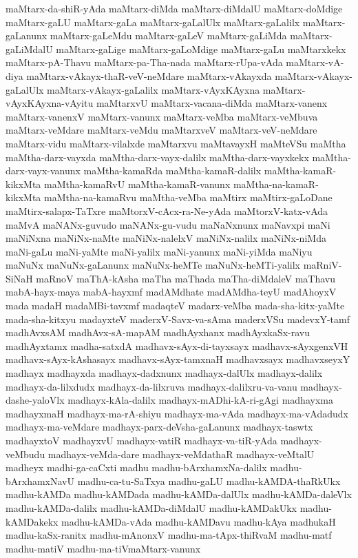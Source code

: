 {maMtarx-da-shiR-yAda
maMtarx-diMda
maMtarx-diMdalU
maMtarx-doMdige
maMtarx-gaLU
maMtarx-gaLa
maMtarx-gaLalUlx
maMtarx-gaLalilx
maMtarx-gaLanunx
maMtarx-gaLeMdu
maMtarx-gaLeV
maMtarx-gaLiMda
maMtarx-gaLiMdalU
maMtarx-gaLige
maMtarx-gaLoMdige
maMtarx-gaLu
maMtarxkekx
maMtarx-pA-Thavu
maMtarx-pa-Tha-nada
maMtarx-rUpa-vAda
maMtarx-vA-diya
maMtarx-vAkayx-thaR-veV-neMdare
maMtarx-vAkayxda
maMtarx-vAkayx-gaLalUlx
maMtarx-vAkayx-gaLalilx
maMtarx-vAyxKAyxna
maMtarx-vAyxKAyxna-vAyitu
maMtarxvU
maMtarx-vacana-diMda
maMtarx-vanenx
maMtarx-vanenxV
maMtarx-vanunx
maMtarx-veMba
maMtarx-veMbuva
maMtarx-veMdare
maMtarx-veMdu
maMtarxveV
maMtarx-veV-neMdare
maMtarx-vidu
maMtarx-vilalxde
maMtarxvu
maMtavayxH
maMteVSu
maMtha
maMtha-darx-vayxda
maMtha-darx-vayx-dalilx
maMtha-darx-vayxkekx
maMtha-darx-vayx-vanunx
maMtha-kamaRda
maMtha-kamaR-dalilx
maMtha-kamaR-kikxMta
maMtha-kamaRvU
maMtha-kamaR-vanunx
maMtha-na-kamaR-kikxMta
maMtha-na-kamaRvu
maMtha-veMba
maMtirx
maMtirx-gaLoDane
maMtirx-salapx-TaTxre
maMtorxV-cAcx-ra-Ne-yAda
maMtorxV-katx-vAda
maMvA
maNANx-guvudo
maNANx-gu-vudu
maNaNxnunx
maNavxpi
maNi
maNiNxna
maNiNx-naMte
maNiNx-nalelxV
maNiNx-nalilx
maNiNx-niMda
maNi-gaLu
maNi-yaMte
maNi-yalilx
maNi-yanunx
maNi-yiMda
maNiyu
maNuNx
maNuNx-gaLanunx
maNuNx-heMTe
maNuNx-heMTi-yalilx
maRniV-SiNaH
maRnoV
maThA-kAsha
maTha
maThada
maTha-diMdaleV
maThavu
mabA-hayx-maya
mabA-hayxmf
madAMdhate
madAMdha-teyU
madAhoyxV
mada
madaH
madaMBi-tavxmf
madaqteV
madarx-veMba
mada-sha-kitx-yaMte
mada-sha-kitxyu
madayxteV
maderxV-Savx-va-sAma
maderxVSu
madevxY-tamf
madhAvxsAM
madhAvx-sA-mapAM
madhAyxhanx
madhAyxkaSx-ravu
madhAyxtamx
madha-satxdA
madhavx-sAyx-di-tayxsayx
madhavx-sAyxgenxVH
madhavx-sAyx-kAshasayx
madhavx-sAyx-tamxnaH
madhavxsayx
madhavxseyxY
madhayx
madhayxda
madhayx-dadxnunx
madhayx-dalUlx
madhayx-dalilx
madhayx-da-lilxdudx
madhayx-da-lilxruva
madhayx-dalilxru-va-vanu
madhayx-dashe-yaloVlx
madhayx-kAla-dalilx
madhayx-mADhi-kA-ri-gAgi
madhayxma
madhayxmaH
madhayx-ma-rA-shiyu
madhayx-ma-vAda
madhayx-ma-vAdadudx
madhayx-ma-veMdare
madhayx-parx-deVsha-gaLanunx
madhayx-taswtx
madhayxtoV
madhayxvU
madhayx-vatiR
madhayx-va-tiR-yAda
madhayx-veMbudu
madhayx-veMda-dare
madhayx-veMdathaR
madhayx-veMtalU
madheyx
madhi-ga-caCxti
madhu
madhu-bArxhamxNa-dalilx
madhu-bArxhamxNavU
madhu-ca-tu-SaTxya
madhu-gaLU
madhu-kAMDA-thaRkUkx
madhu-kAMDa
madhu-kAMDada
madhu-kAMDa-dalUlx
madhu-kAMDa-daleVlx
madhu-kAMDa-dalilx
madhu-kAMDa-diMdalU
madhu-kAMDakUkx
madhu-kAMDakekx
madhu-kAMDa-vAda
madhu-kAMDavu
madhu-kAya
madhukaH
madhu-kaSx-ranitx
madhu-mAnonxV
madhu-ma-tApx-thiRvaM
madhu-matf
madhu-matiV
madhu-ma-tiVmaMtarx-vanunx
}

